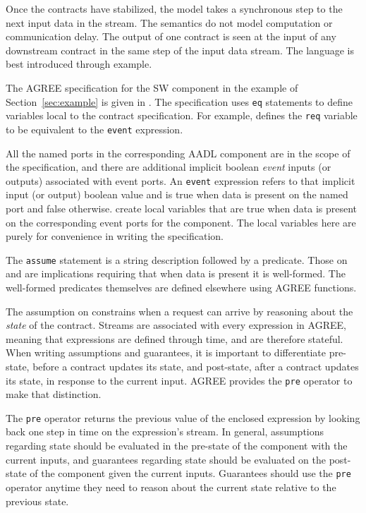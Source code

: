 Once the contracts have stabilized, the model takes a synchronous step to the next input data in the stream.
The semantics do not model computation or communication delay.
The output of one contract is seen at the input of any downstream contract in the same step of the input data stream.
The language is best introduced through example.

The AGREE specification for the SW component in the example of Section~\ref{sec:example} is given in .
The specification uses \texttt{eq} statements to define variables local to the contract specification.
For example,  defines the \texttt{req} variable to be equivalent to the \texttt{event} expression.

All the named ports in the corresponding AADL component are in the scope of the specification, and there are additional implicit boolean \emph{event} inputs (or outputs) associated with event ports.
An \texttt{event} expression refers to that implicit input (or output) boolean value and is true when data is present on the named port and false otherwise.
 create local variables that are true when data is present on the corresponding event ports for the component.
The local variables here are purely for convenience in writing the specification.

The \texttt{assume} statement is a string description followed by a predicate.
Those on  and  are implications requiring that when data is present it is well-formed.
The well-formed predicates themselves are defined elsewhere using AGREE functions.

The assumption on  constrains when a request can arrive by reasoning about the \emph{state} of the contract.
Streams are associated with every expression in AGREE, meaning that expressions are defined through time, and are therefore stateful.
When writing assumptions and guarantees, it is important to differentiate pre-state, before a contract updates its state, and post-state, after a contract updates its state, in response to the current input. AGREE provides the \texttt{pre} operator to make that distinction.

The \texttt{pre} operator returns the previous value of the enclosed expression by looking back one step in time on the expression's stream.
In general, assumptions regarding state should be evaluated in the pre-state of the component with the current inputs, and guarantees regarding state should be evaluated on the post-state of the component given the current inputs.
Guarantees should use the \texttt{pre} operator anytime they need to reason about the current state relative to the previous state. 


